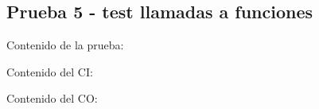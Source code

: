 \documentclass[11pt, , a4paper, titlepage]{article}
\newenvironment{changemargin}[2]{%
\begin{list}{}{%
\setlength{\topsep}{0pt}%
\setlength{\leftmargin}{#1}%
\setlength{\rightmargin}{#2}%
\setlength{\listparindent}{\parindent}%
\setlength{\itemindent}{\parindent}%
\setlength{\parsep}{\parskip}%
}%
\item[]}{\end{list}}
\begin{document}
\clearpage

\subsection{Prueba 5 - test llamadas a funciones}
\vspace{2mm}
Contenido de la prueba:
\vspace{2mm}
\begin{changemargin}{+3cm}{+2cm}
    
\end{changemargin} 
\vspace{2mm}
Contenido del CI:
\vspace{2mm}
\begin{changemargin}{+1cm}{+0cm}
    
\end{changemargin} 
\vspace{2mm}
Contenido del CO:
\vspace{2mm}
\begin{changemargin}{+1cm}{-2cm}
    
\end{changemargin} 


\clearpage
\printbibliography[heading=bibnumbered]
\end{document}
